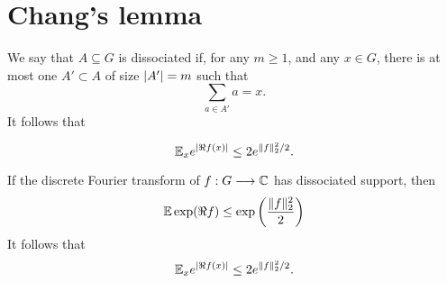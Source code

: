 \chapter{Chang's lemma}

\begin{definition}[Dissociation]
\label{dissociated}
\leanok
We say that $A\subseteq G$ is dissociated if, for any $m\geq 1$, and any $x\in G$, there is at most one $A'\subset A$ of size $\left\lvert A'\right\rvert=m$ such that
\[\sum_{a\in A'}a=x.\]
It follows that

\[\mathbb{E}_x e^{\left\lvert \Re f(x)\right\rvert} \leq 2e^{\| f\|_2^2/2}.\]
\end{definition}


\begin{lemma}
\label{rudin_exp}
\leanok
If the discrete Fourier transform of $f : G \longrightarrow \mathbb{C}$ has dissociated support, then
$$\mathbb{E} \exp(\Re f) \le \exp\left(\frac{\lVert f\rVert_2^2} 2\right)$$
It follows that
\[\mathbb{E}_x e^{\left\lvert \Re f(x)\right\rvert} \leq 2e^{\| f\|_2^2/2}.\]
\end{lemma}
